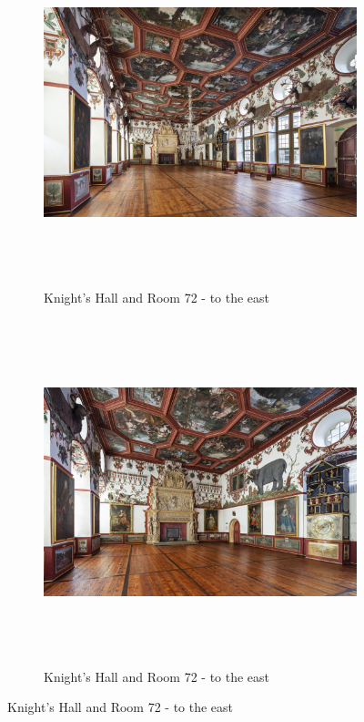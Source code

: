 \documentclass[
  a4paper,
]{book}
\begin{document}
\begin{figure}
\begin{figure}[H]    
  \includegraphics[height=10cm]{images/fmd10005859a.jpg}
  \caption{Knight's Hall and Room 72 - to the east}
  \label{fig:{images/fmd10005859a.jpg}}
\end{figure}

\clearpage

\begin{figure}[H]    
  \includegraphics[height=10cm]{images/fmd10005860a.jpg}
  \caption{Knight's Hall and Room 72 - to the east}
  \label{fig:{images/fmd10005860a.jpg}}
\end{figure}

\clearpage

\end{figure}%


\backmatter
\end{document}
